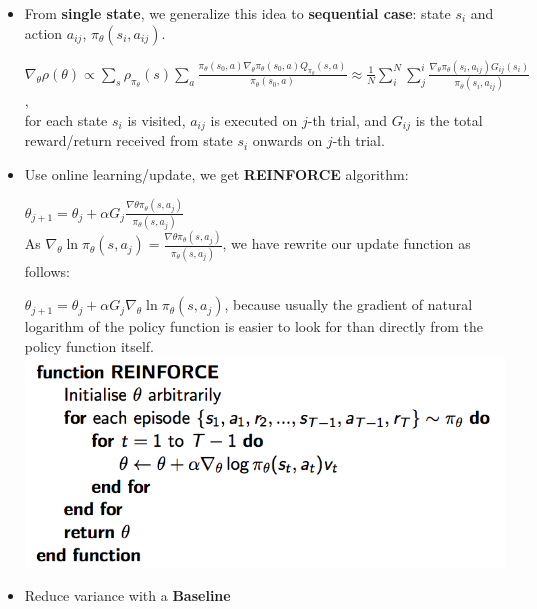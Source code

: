 \documentclass[12pt]{article}
\begin{document}
 \begin{itemize}
 \item From \textbf{single state}, we generalize this idea to \textbf{sequential case}: state $s_i$ and action $a_{ij}$, $\pi_\theta(s_i, a_{ij}) $. 
 
 $\nabla_\theta \rho (\theta)  \propto \sum_{s}^{} \rho_{\pi_\theta}(s) \sum_{a}^{} \frac{ \pi_\theta(s_0, a) \nabla_\theta \pi_\theta(s_0, a)Q_{\pi_\theta}(s, a)}{\pi_\theta(s_0, a)}  \approx \frac{1}{N} \sum_{i}^{N} \sum_{j}^{i} \frac{\nabla_\theta \pi_\theta(s_i, a_{ij})G_{ij}(s_i)}{\pi_\theta(s_i, a_{ij})}$, \\
 
 for each state $s_i$ is visited, $a_{ij}$ is executed on $j$-th trial, and $G_{ij}$ is the total reward/return received from state $s_i$ onwards on $j$-th trial.
 
 \item Use online learning/update, we get \textbf{REINFORCE} algorithm: 
 
 $\theta_{j+1} = \theta_{j} + \alpha G_j \frac{\nabla \theta\pi_\theta (s, a_j)}{\pi_\theta (s, a_j)}$\\
 
 As $\nabla_\theta \ln{\pi_\theta (s, a_j)}  = \frac{\nabla \theta\pi_\theta (s, a_j)}{\pi_\theta (s, a_j)}$, we have rewrite our update function as follows: 
 
 $\theta_{j+1} = \theta_{j} + \alpha G_j \nabla_\theta \ln{\pi_\theta (s, a_j)}$, because usually the gradient of natural logarithm of  the policy function is easier to look for than directly from the policy function itself.\\

 \includegraphics[scale=0.42]{reinforce}\\
 
 
 \item Reduce variance with a \textbf{Baseline}\\
 

\end{itemize}
\end{document}
